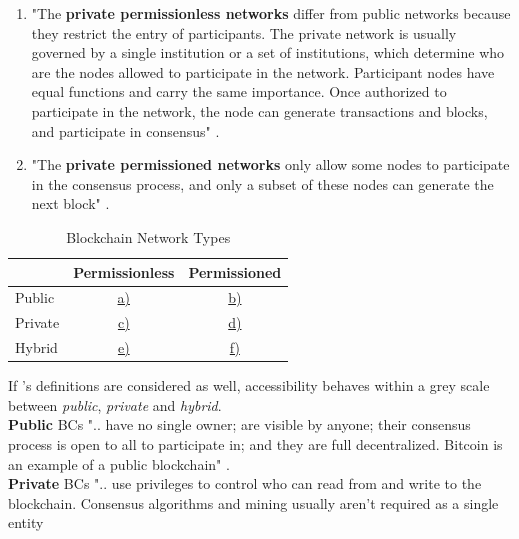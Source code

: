 \begin{enumerate}
\begin{enumerate}
		\item "The \textbf{private permissionless networks} differ from public networks because they restrict the entry of participants.
		The private network is usually governed by a single institution or a set of institutions, which determine who are the nodes allowed to participate in the network.
		Participant nodes have equal functions and carry the same importance.
		Once authorized to participate in the network, the node can generate transactions and blocks, and participate in consensus" \cite[182]{Oliveira.2019}.
		\label{def:PrivatePermissionlessBCNetworks}
		
		\item "The \textbf{private permissioned networks} only allow some nodes to participate in the consensus process,
		and only a subset of these nodes can generate the next block" \cite[182]{Oliveira.2019}.
		\label{def:PrivatePermissionedBCNetworks}
	\end{enumerate}
	\begin{table}
		\centering
		\begin{tabularx}{0.48\textwidth}{ l | c | c }
			& Permissionless & Permissioned \\ \hline
			Public & \hyperref[def:PublicPermissionlessBCNetworks]{a)} & \hyperref[def:PublicPermissionedBCNetworks]{b)} \\ \hline
			Private & \hyperref[def:PrivatePermissionlessBCNetworks]{c)} & \hyperref[def:PrivatePermissionedBCNetworks]{d)} \\ \hline
			Hybrid & \hyperref[def:HybridPermissionlessBCNetworks]{e)} & \hyperref[def:HybridPermissionedBCNetworks]{f)} \\
			\hline
		\end{tabularx}
		\caption{Blockchain Network Types}
		\label{tbl:BlockchainNetworkTypes}
	\end{table}
	\noindent If \citet{SultanK..2018}'s definitions are considered as well,
	accessibility behaves within a grey scale between \textit{public}, \textit{private} and \textit{hybrid}. \\	
	\textbf{Public} \gls{BC}s ".. have no single owner; are visible by anyone;
	their consensus process is open to all to participate in;
	and they are full decentralized. Bitcoin is an example of a public blockchain" \cite[53]{SultanK..2018}. \\
	\textbf{Private} \gls{BC}s ".. use privileges to control who can read from and write to the blockchain.
	Consensus algorithms and mining usually aren’t required as a single entity

\end{enumerate}
